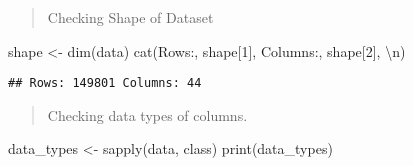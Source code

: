 \documentclass[
]{article}
\newenvironment{Shaded}{\begin{snugshade}}{\end{snugshade}}
\newcommand{\DecValTok}[1]{\textcolor[rgb]{0.00,0.00,0.81}{#1}}
\newcommand{\FunctionTok}[1]{\textcolor[rgb]{0.00,0.00,0.00}{#1}}
\newcommand{\NormalTok}[1]{#1}
\newcommand{\OtherTok}[1]{\textcolor[rgb]{0.56,0.35,0.01}{#1}}
\newcommand{\SpecialCharTok}[1]{\textcolor[rgb]{0.00,0.00,0.00}{#1}}
\newcommand{\StringTok}[1]{\textcolor[rgb]{0.31,0.60,0.02}{#1}}
\begin{document}
\begin{quote}
Checking Shape of Dataset
\end{quote}

\begin{Shaded}
\begin{Highlighting}[]
\NormalTok{shape }\OtherTok{\textless{}{-}} \FunctionTok{dim}\NormalTok{(data)}
\FunctionTok{cat}\NormalTok{(}\StringTok{\textquotesingle{}Rows:\textquotesingle{}}\NormalTok{, shape[}\DecValTok{1}\NormalTok{], }\StringTok{\textquotesingle{}Columns:\textquotesingle{}}\NormalTok{, shape[}\DecValTok{2}\NormalTok{], }\StringTok{\textquotesingle{}}\SpecialCharTok{\textbackslash{}n}\StringTok{\textquotesingle{}}\NormalTok{)}
\end{Highlighting}
\end{Shaded}

\begin{verbatim}
## Rows: 149801 Columns: 44
\end{verbatim}

\begin{quote}
Checking data types of columns.
\end{quote}

\begin{Shaded}
\begin{Highlighting}[]
\NormalTok{data\_types }\OtherTok{\textless{}{-}} \FunctionTok{sapply}\NormalTok{(data, class)}
\FunctionTok{print}\NormalTok{(data\_types)}
\end{Highlighting}
\end{Shaded}
\end{document}

